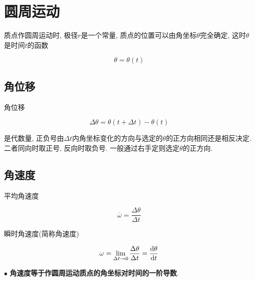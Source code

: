 \section{圆周运动} \label{1.3}

质点作圆周运动时, 极径$r$是一个常量, 质点的位置可以由角坐标$\theta$完全确定, 这时$\theta$是时间$t$的函数

\begin{equation}
	\theta = \theta(t) \label{C1-eq20}
\end{equation}

\subsection{角位移}

\begin{definition}[角位移] \label{C1-df5}
	
	角位移 
	
	\begin{equation}
		\Delta \theta = \theta(t + \Delta t) - \theta(t) \label{C1-eq21}
	\end{equation}
	
	是代数量, 正负号由$\Delta t$内角坐标变化的方向与选定的$\theta$的正方向相同还是相反决定. 二者同向时取正号, 反向时取负号. 一般通过右手定则选定$\theta$的正方向. 
	
\end{definition}

\subsection{角速度}

\begin{definition} \label{C1-df6}
	
	平均角速度
	
	\begin{equation}
		\overline{\omega} = \dfrac{\Delta \theta}{\Delta t} \label{C1-eq22}
	\end{equation}
	
	瞬时角速度(简称角速度)
	
	\begin{equation}
		\omega = \lim\limits_{\Delta t \to 0} \dfrac{\Delta \theta}{\Delta t} = \dv{\theta}{t} \label{C1-eq23}
	\end{equation}
	
\end{definition}

$\bullet$ \textbf{角速度等于作圆周运动质点的角坐标对时间的一阶导数}. 


